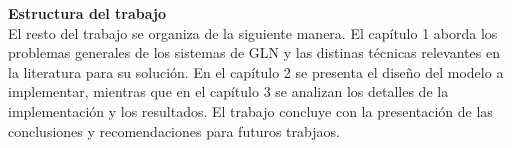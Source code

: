     \textbf{Estructura del trabajo}\\

    El resto del trabajo se organiza de la siguiente manera. El capítulo 1 aborda los problemas generales de los sistemas de GLN 
y las distinas técnicas relevantes en la literatura para su solución. En el capítulo 2 se presenta el diseño del modelo a implementar, mientras 
que en el capítulo 3 se analizan los detalles de la implementación y los resultados. El trabajo concluye con la presentación de las 
conclusiones y recomendaciones para futuros trabjaos.
